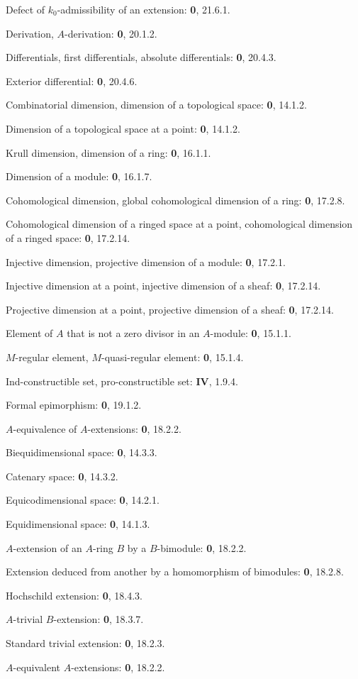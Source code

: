 Defect of $k_0$-admissibility of an extension: \textbf{0}, 21.6.1.\par
Derivation, $A$-derivation: \textbf{0}, 20.1.2.\par
Differentials, first differentials, absolute differentials: \textbf{0}, 20.4.3.\par
Exterior differential: \textbf{0}, 20.4.6.\par
Combinatorial dimension, dimension of a topological space: \textbf{0}, 14.1.2.\par
Dimension of a topological space at a point: \textbf{0}, 14.1.2.\par
Krull dimension, dimension of a ring: \textbf{0}, 16.1.1.\par
Dimension of a module: \textbf{0}, 16.1.7.\par
Cohomological dimension, global cohomological dimension of a ring: \textbf{0}, 17.2.8.\par
Cohomological dimension of a ringed space at a point, cohomological dimension of a ringed space: \textbf{0}, 17.2.14.\par

\clearpage
{}
Injective dimension, projective dimension of a module: \textbf{0}, 17.2.1.\par
Injective dimension at a point, injective dimension of a sheaf: \textbf{0}, 17.2.14.\par
Projective dimension at a point, projective dimension of a sheaf: \textbf{0}, 17.2.14.\par

Element of $A$ that is not a zero divisor in an $A$-module: \textbf{0}, 15.1.1.\par
$M$-regular element, $M$-quasi-regular element: \textbf{0}, 15.1.4.\par
Ind-constructible set, pro-constructible set: \textbf{IV}, 1.9.4.\par
Formal epimorphism: \textbf{0}, 19.1.2.\par
$A$-equivalence of $A$-extensions: \textbf{0}, 18.2.2.\par
Biequidimensional space: \textbf{0}, 14.3.3.\par
Catenary space: \textbf{0}, 14.3.2.\par
Equicodimensional space: \textbf{0}, 14.2.1.\par
Equidimensional space: \textbf{0}, 14.1.3.\par
$A$-extension of an $A$-ring $B$ by a $B$-bimodule: \textbf{0}, 18.2.2.\par
Extension deduced from another by a homomorphism of bimodules: \textbf{0}, 18.2.8.\par
Hochschild extension: \textbf{0}, 18.4.3.\par
$A$-trivial $B$-extension: \textbf{0}, 18.3.7.\par
Standard trivial extension: \textbf{0}, 18.2.3.\par
$A$-equivalent $A$-extensions: \textbf{0}, 18.2.2.\par


